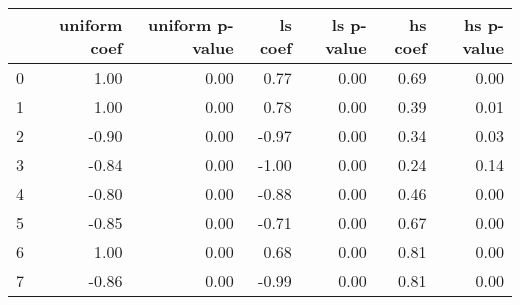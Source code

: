 \begin{tabular}{lrrrrrr}
\toprule
 & uniform coef & uniform p-value & ls coef & ls p-value & hs coef & hs p-value \\
\midrule
0 & 1.00 & 0.00 & 0.77 & 0.00 & 0.69 & 0.00 \\
1 & 1.00 & 0.00 & 0.78 & 0.00 & 0.39 & 0.01 \\
2 & -0.90 & 0.00 & -0.97 & 0.00 & 0.34 & 0.03 \\
3 & -0.84 & 0.00 & -1.00 & 0.00 & 0.24 & 0.14 \\
4 & -0.80 & 0.00 & -0.88 & 0.00 & 0.46 & 0.00 \\
5 & -0.85 & 0.00 & -0.71 & 0.00 & 0.67 & 0.00 \\
6 & 1.00 & 0.00 & 0.68 & 0.00 & 0.81 & 0.00 \\
7 & -0.86 & 0.00 & -0.99 & 0.00 & 0.81 & 0.00 \\
\bottomrule
\end{tabular}

